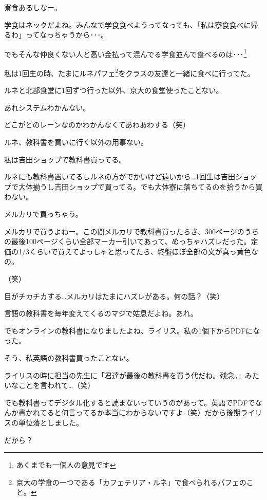 \begin{multicols}{2}
  寮食あるしなー。

  学食はネックだよね。みんなで学食食べようってなっても、「私は寮食食べに帰るわ」ってなっちゃうから･･･。

  でもそんな仲良くない人と高い金払って混んでる学食並んで食べるのは･･･\footnote{あくまでも一個人の意見です}

  私は1回生の時、たまにルネパフェ\footnote{京大の学食の一つである「カフェテリア・ルネ」で食べられるパフェのこと。}をクラスの友達と一緒に食べに行ってた。

  ルネと北部食堂に1回ずつ行った以外、京大の食堂使ったことない。

  あれシステムわかんない。

  どこがどのレーンなのかわかんなくてあわあわする（笑）

  ルネ、教科書を買いに行く以外の用事ない。

  私は吉田ショップで教科書買ってる。

  ルネにも教科書置いてるしルネの方がでかいけど遠いから…1回生は吉田ショップで大体揃うし吉田ショップで買ってる。でも大体寮に落ちてるのを拾うから買わない。

  メルカリで買っちゃう。

  メルカリで買うよねー。この間メルカリで教科書買ったらさ、300ページのうちの最後100ページくらい全部マーカー引いてあって、めっちゃハズレだった。定価の1/3くらいで買えてよっしゃと思ってたら、終盤ほぼ全部の文が真っ黄色なの。

  （笑）

  目がチカチカする…メルカリはたまにハズレがある。何の話？（笑）

  言語の教科書を毎年変えてくるのマジで姑息だよね。あれ。

  でもオンラインの教科書になりましたよね、ライリス。私の1個下からPDFになった。

  そう、私英語の教科書買ったことない。

  ライリスの時に担当の先生に「君達が最後の教科書を買う代だね。残念。」みたいなことを言われて…（笑）

  でも教科書ってデジタル化すると読まないっていうのがあって。英語でPDFでなんか書かれてると何言ってるか本当にわからないですよ（笑）だから後期ライリスの単位落としました。

  だから？


\end{multicols}
